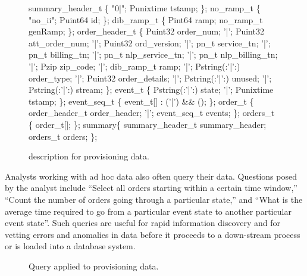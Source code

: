 \begin{figure}
\begin{small}
\begin{code}
  summary\_header\_t \{
  "0|";
  Punixtime tstamp;
\};
\mbox{}
 no\_ramp\_t \{
  "no\_ii";
  Puint64 id;
\};
\mbox{}
 dib\_ramp\_t \{
  Pint64     ramp;
  no\_ramp\_t  genRamp;
\};
\mbox{}
 order\_header\_t \{
       Puint32             order\_num;
 '|';  Puint32             att\_order\_num;
 '|';  Puint32             ord\_version;
 '|';   pn\_t           service\_tn;
 '|';   pn\_t           billing\_tn;
 '|';   pn\_t           nlp\_service\_tn;
 '|';   pn\_t           nlp\_billing\_tn;
 '|';   Pzip           zip\_code;
 '|';  dib\_ramp\_t          ramp;
 '|';  Pstring(:'|':)      order\_type;
 '|';  Puint32             order\_details;
 '|';  Pstring(:'|':)      unused;
 '|';  Pstring(:'|':)      stream;
\};
\mbox{}
 event\_t \{
       Pstring(:'|':)    state;   
  '|'; Punixtime         tstamp;
\};
\mbox{}
 event\_seq\_t \{
  event\_t[] : ('|') && ();
\};
\mbox{}
  order\_t \{
       order\_header\_t  order\_header;
  '|'; event\_seq\_t     events;
\};
\mbox{}
 orders\_t \{
  order\_t[];
\};
\mbox{}
  summary\{
  summary\_header\_t  summary\_header;
  orders\_t          orders;
\};
\end{code}
\end{small}
\caption{\pads{} description for \dibbler{} provisioning data.}
\label{figure:dibbler}
\end{figure}

Analysts working with ad hoc data also often query their data.  
Questions posed by the \dibbler{} analyst include ``Select all
orders starting within a certain time window,'' ``Count the number of
orders going through a particular state,'' and ``What is the average
time required to go from a particular event state to another
particular event state''.  Such queries are useful for rapid
information discovery and for vetting errors and anomalies in data
before it proceeds to a down-stream process or is loaded into a 
database system. 

\begin{figure}
\begin{small}
\end{small}
\caption{Query applied to \dibbler{} provisioning data.}
\label{figure:dibbler-query}
\end{figure}

